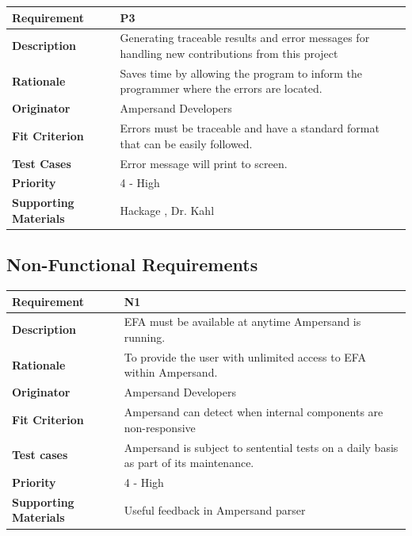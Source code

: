 \documentclass[12pt]{report}
\begin{document}
{\setlength{\tabcolsep}{6pt} %
    \begin{tabularx}{\textwidth}{>{\bfseries}C{3cm}X}
        Requirement & P3 \\ 
        \midrule
        \endhead
        Description  & Generating traceable results and error messages for 
        handling new contributions from this project
        \\	Rationale & Saves time by allowing the program to inform the 
        programmer where the errors are located.
        \\	Originator & Ampersand Developers
        \\	Fit Criterion & Errors must be traceable and have a standard format 
        that can be easily followed.
        \\ Test Cases & Error message will print to screen.
        \\	Priority & 4 - High
        \\	Supporting Materials & Hackage \cite{hackage}, Dr. Kahl
        \vspace{12pt}
    \end{tabularx}
}

\subsection{Non-Functional Requirements}
{\setlength{\tabcolsep}{6pt} %
    \begin{tabularx}{\textwidth}{>{\bfseries}C{3cm}X}
        Requirement & N1 \\ 
        \midrule
        \endhead
        Description  & EFA must be available at anytime Ampersand is running.
        \\	Rationale & To provide the user with unlimited access to EFA within 
        Ampersand.
        \\	Originator & Ampersand Developers
        \\	Fit Criterion & Ampersand can detect when internal components are 
        non-responsive
        \\ Test cases & Ampersand is subject to sentential tests on a daily 
        basis as 
        part of its maintenance.   
        \\	Priority & 4 - High
        \\	Supporting Materials & Useful feedback in Ampersand parser 
        \cite{SB2011}
        \vspace{12pt}
    \end{tabularx}
}
\end{document}
